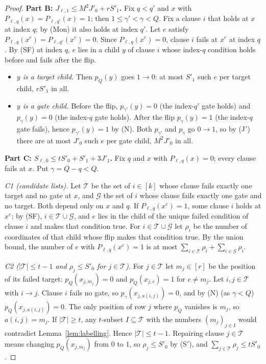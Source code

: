 \documentclass[11pt]{article}
\theoremstyle{definition}
\theoremstyle{remark}
\begin{document}
\begin{proof}
\smallskip\noindent\textbf{Part B: $J_{\ell,1}\le M^2J'_0+rS'_1$.}
Fix $q<q'$ and $x$ with $P_{\ell,q}(x)=P_{\ell,q'}(x)=1$; then
$1\le\gamma'<\gamma<Q$. Fix a clause $i$ that holds at $x$ at index $q$; by
(Mon) it also holds at index $q'$. Let $e$ satisfy
$P_{\ell,q}(x^e)=P_{\ell,q'}(x^e)=0$. Since $P_{\ell,q}(x^e)=0$, clause $i$
fails at $x^e$ at index $q$. By (SF) at index $q$, $e$ lies in a child $y$ of
clause $i$ whose index-$q$ condition holds before and fails after the flip.
\begin{itemize}[leftmargin=*,itemsep=1pt]
\item \emph{$y$ is a target child.} Then $p_Q(y)$ goes $1\to0$: at most
 $S'_1$ such $e$ per target child, $rS'_1$ in all.
\item \emph{$y$ is a gate child.} Before the flip, $p_{\gamma'}(y)=0$ (the
 index-$q'$ gate holds) and $p_\gamma(y)=0$ (the index-$q$ gate holds). After
 the flip $p_\gamma(y)=1$ (the index-$q$ gate fails), hence
 $p_{\gamma'}(y)=1$ by (N). Both $p_{\gamma'}$ and $p_\gamma$ go $0\to1$, so
 by (J$'$) there are at most $J'_0$ such $e$ per gate child, $M^2J'_0$ in all.
\end{itemize}

\smallskip\noindent\textbf{Part C: $S_{\ell,0}\le tS'_0+S'_1+3J'_1$.}
Fix $q$ and $x$ with $P_{\ell,q}(x)=0$; every clause fails at $x$. Put
$\gamma=Q-q<Q$.

\emph{C1 (candidate lists).} Let $\mathcal T$ be the set of $i\in[k]$ whose
clause fails exactly one target and no gate at $x$, and $\mathcal G$ the set
of $i$ whose clause fails exactly one gate and no target. Both depend only on
$x$ and $q$. If $P_{\ell,q}(x^e)=1$, some clause $i$ holds at $x^e$; by (SF),
$i\in\mathcal T\cup\mathcal G$, and $e$ lies in the child of the unique failed
condition of clause $i$ and makes that condition true. For
$i\in\mathcal T\cup\mathcal G$ let $\rho_i$ be the number of coordinates of
that child whose flip makes that condition true. By the union bound, the
number of $e$ with $P_{\ell,q}(x^e)=1$ is at most
$\sum_{i\in\mathcal T}\rho_i+\sum_{i\in\mathcal G}\rho_i$.

\emph{C2 ($|\mathcal T|\le t-1$ and $\rho_j\le S'_0$ for
$j\in\mathcal T$).} For $j\in\mathcal T$ let $m_j\in[r]$ be the position of
its failed target: $p_Q(x_{j,m_j})=0$ and $p_Q(x_{j,c})=1$ for $c\ne m_j$.
Let $i,j\in\mathcal T$ with $i\to j$. Clause $i$ fails no gate, so
$p_\gamma(x_{j,a(i,j)})=0$, and by (N) (as $\gamma<Q$)
$p_Q(x_{j,a(i,j)})=0$. The only position of row $j$ where $p_Q$ vanishes is
$m_j$, so $a(i,j)=m_j$. If $|\mathcal T|\ge t$, any $t$-subset
$I\subseteq\mathcal T$ with the numbers $(m_j)_{j\in I}$ would contradict
Lemma~\ref{lem:labelling}. Hence $|\mathcal T|\le t-1$. Repairing clause
$j\in\mathcal T$ means changing $p_Q(x_{j,m_j})$ from $0$ to $1$, so
$\rho_j\le S'_0$ by (S$'$), and
$\sum_{j\in\mathcal T}\rho_j\le tS'_0$.


\end{proof}
\end{document}
